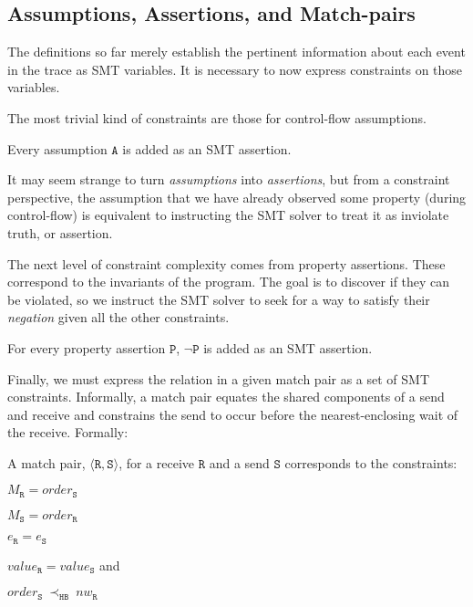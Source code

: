 \subsection{Assumptions, Assertions, and Match-pairs}

The definitions so far merely establish the pertinent information
about each event in the trace as SMT variables. It is necessary to now express
constraints on those variables.

The most trivial kind of constraints are those for control-flow
assumptions.

\begin{definition}[Assumption] \label{def:assm}
Every assumption $\mathtt{A}$ is added as an SMT assertion.
\end{definition}

It may seem strange to turn \emph{assumptions} into
\emph{assertions}, but from a constraint perspective, the assumption
that we have already observed some property (during control-flow) is
equivalent to instructing the SMT solver to treat it as inviolate
truth, or assertion.

The next level of constraint complexity comes from property
assertions. These correspond to the invariants of the program. The
goal is to discover if they can be violated, so we instruct the SMT
solver to seek for a way to satisfy their \emph{negation} given all
the other constraints.

\begin{definition} \label{def:assert}
For every property assertion $\mathtt{P}$, $\neg \mathtt{P}$ is added as
an SMT assertion.
\end{definition}

Finally, we must express the relation in a given match pair as a set of SMT
constraints. Informally, a match pair equates the shared components of
a send and receive and constrains the send to occur before the
nearest-enclosing wait of the receive. Formally:

\begin{definition} \label{def:match}
A match pair, $\langle\mathtt{R}, \mathtt{S}\rangle$, for a receive
$\mathtt{R}$ and a send $\mathtt{S}$ corresponds to the constraints:
\begin{compactenum}
\item $M_{\mathtt{R}} = \mathit{order}_{\mathtt{S}}$
\item $M_{\mathtt{S}} = \mathit{order}_{\mathtt{R}}$
\item $e_{\mathtt{R}} = e_{\mathtt{S}}$
\item $\mathit{value}_{\mathtt{R}} = \mathit{value}_{\mathtt{S}}$ and
\item $\mathit{order}_{\mathtt{S}}\ \mathrm{\prec_\mathtt{HB}}\ \mathit{nw}_{\mathtt{R}}$
\end{compactenum}
\end{definition}

